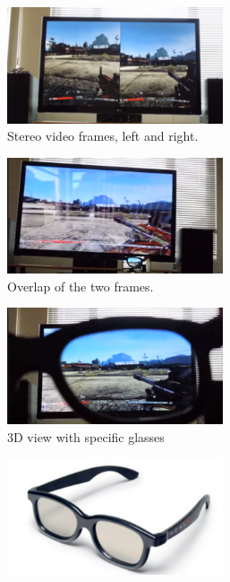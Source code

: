 \begin{figure}[h!]
\centering
\begin{subfigure}[]{0.4\textwidth}
		\centering
        \includegraphics[width=0.7\textwidth]{./img/games1.png}
                \caption{\scriptsize{Stereo video frames, left and right.\newline}}
\end{subfigure}
\begin{subfigure}[]{0.4\textwidth}
		\centering
        \includegraphics[width=0.7\textwidth]{./img/games2.png}
                \caption{\scriptsize{Overlap of the two frames.}}
\end{subfigure} 
\begin{subfigure}[]{0.4\textwidth}
		\centering
        \includegraphics[width=0.7\textwidth]{./img/games3.png}
                \caption{\scriptsize{3D view with specific glasses}}
\end{subfigure}%
\begin{subfigure}[]{0.4\textwidth}
		\centering
        \includegraphics[width=0.7\textwidth]{./img/games4.png}

\end{subfigure}
\end{figure}
